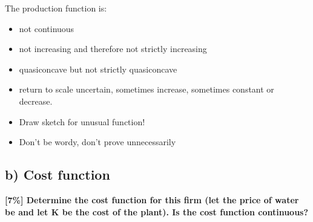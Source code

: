 \documentclass{article}
\begin{document}
The production function is:
\begin{itemize}
\item not continuous
\item not increasing and therefore not strictly increasing
\item quasiconcave but not strictly quasiconcave
\item return to scale uncertain, sometimes increase, sometimes constant or decrease.
\end{itemize}


\begin{mdframed}[backgroundcolor=yellow!20,linecolor=white]
\begin{itemize}
\item Draw sketch for unusual function!
\item Don't be wordy, don't prove unnecessarily 
\end{itemize}
\end{mdframed}

\subsection{b) Cost function}

\textbf{[7\%] Determine the cost function for this firm (let the price of
water be and let K be the cost of the plant). Is the cost function
continuous?}
\end{document}
